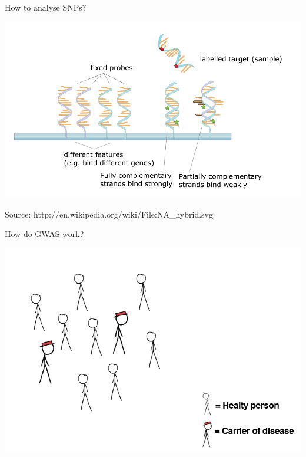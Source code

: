 \documentclass[12pt,a4paper]{beamer}
\begin{document}
\begin{frame}{How to analyse SNPs?}
\begin{center}
\includegraphics[scale=0.3]{microarray.png} \\
\begin{tiny}
Source: http://en.wikipedia.org/wiki/File:NA\_hybrid.svg
\end{tiny}
\end{center}
\end{frame}

\begin{frame}{How do GWAS work?}
\begin{center}
\includegraphics[scale=0.3]{distribution-disease.png} \\
\end{center}
\end{frame}
\end{document}
